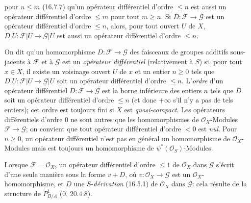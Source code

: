 pour $n\leq m$ (16.7.7) qu'un opérateur différentiel d'ordre $\leq n$ est
aussi un opérateur différentiel d'ordre $\leq m$ pour tout $m\geq n$. Si
$D:\mathscr{F}\to\mathscr{G}$ est un opérateur différentiel d'ordre
$\leq n$, alors, pour tout ouvert $U$ de $X$,
$D|U:\mathscr{F}|U\to\mathscr{G}|U$ est aussi un opérateur différentiel
d'ordre $\leq n$.

On dit qu'un homomorphisme $D:\mathscr{F}\to\mathscr{G}$ des faisceaux de
groupes additifs sous-jacents à $\mathscr{F}$ et à $\mathscr{G}$ est un
\emph{opérateur différentiel} (relativement à $S$) si, pour tout $x\in X$, il
existe un voisinage ouvert $U$ de $x$ et un entier $n\geq0$ tels que
$D|U:\mathscr{F}|U\to\mathscr{G}|U$ soit un opérateur différentiel d'ordre
$\leq n$. L'\emph{ordre} d'un opérateur différentiel
$D:\mathscr{F}\to\mathscr{G}$ est la borne inférieure des entiers $n$ tels
que $D$ soit un opérateur différentiel d'ordre $\leq n$ (et donc $+\infty$
s'il n'y a pas de tels entiers); cet ordre est toujours fini si $X$ est
\emph{quasi-compact}. Les opérateurs différentiels d'ordre $0$ ne sont autres
que les homomorphismes de $\mathcal{O}_X$-Modules
$\mathscr{F}\to\mathscr{G}$; on convient que tout opérateur différentiel
d'ordre $<0$ est \emph{nul}. Pour $n\geq0$, un opérateur différentiel n'est
pas en général un homomorphisme de $\mathcal{O}_X$-Modules mais est toujours
un homomorphisme de $\psi^*(\mathcal{O}_S)$-Modules.

Lorsque $\mathscr{F}=\mathcal{O}_X$, un opérateur différentiel d'ordre
$\leq1$ de $\mathcal{O}_X$ dans $\mathscr{G}$ s'écrit d'une seule manière
sous la forme $v+D$, où $v:\mathcal{O}_X\to\mathscr{G}$ est un
$\mathcal{O}_X$-homomorphisme, et $D$ une $S$-\emph{dérivation} (16.5.1) de
$\mathcal{O}_X$ dans $\mathscr{G}$: cela résulte de la structure de
$P_{B/A}^1$ (0, 20.4.8).

